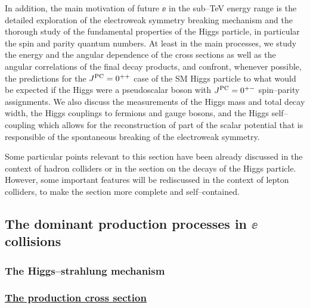 In addition, the main motivation of future $\ee$ in the sub--TeV 
energy range is the detailed exploration of the electroweak symmetry breaking 
mechanism and the thorough study of the fundamental properties of the Higgs 
particle, in particular the spin and parity quantum numbers. At least in the 
main processes, we study the energy and the angular dependence of the 
cross sections as well as the angular correlations of the final decay products,
and confront, whenever possible, the predictions for the $J^{\rm PC}=0^{++}$ 
case of the SM Higgs particle to what would be expected if the Higgs were a 
pseudoscalar boson with $J^{\rm PC}=0^{+-}$ spin--parity assignments. We also 
discuss the measurements of the Higgs mass and total decay width, the Higgs 
couplings to fermions and gauge bosons, and the Higgs self--coupling which 
allows for the reconstruction of part of the scalar potential that is 
responsible of the spontaneous breaking of the electroweak symmetry. \s

Some particular points relevant to this section have been already discussed in 
the context of hadron colliders or in the section on the decays of the Higgs 
particle. However, some important features will be rediscussed in the context 
of lepton colliders, to make the section more complete and self--contained. 

\newpage

\subsection{The dominant production processes in $\ee$ collisions}

\subsubsection{The Higgs--strahlung mechanism}

\subsubsection*{\underline{The production cross section}}

